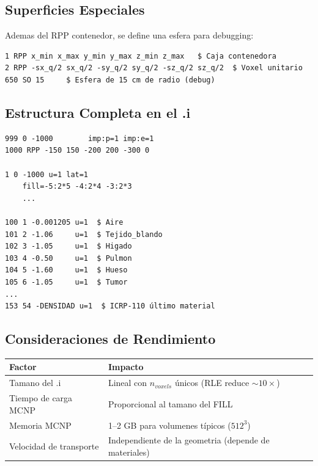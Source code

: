 \documentclass[12pt,a4paper]{article}
\begin{document}

\subsection{Superficies Especiales}

Ademas del RPP contenedor, se define una esfera para debugging:

\begin{lstlisting}
1 RPP x_min x_max y_min y_max z_min z_max   $ Caja contenedora
2 RPP -sx_q/2 sx_q/2 -sy_q/2 sy_q/2 -sz_q/2 sz_q/2  $ Voxel unitario
650 SO 15     $ Esfera de 15 cm de radio (debug)
\end{lstlisting}

\subsection{Estructura Completa en el .i}

\begin{lstlisting}
999 0 -1000        imp:p=1 imp:e=1
1000 RPP -150 150 -200 200 -300 0

1 0 -1000 u=1 lat=1
    fill=-5:2*5 -4:2*4 -3:2*3
    ...

100 1 -0.001205 u=1  $ Aire
101 2 -1.06     u=1  $ Tejido_blando
102 3 -1.05     u=1  $ Higado
103 4 -0.50     u=1  $ Pulmon
104 5 -1.60     u=1  $ Hueso
105 6 -1.05     u=1  $ Tumor
...
153 54 -DENSIDAD u=1  $ ICRP-110 último material
\end{lstlisting}

\subsection{Consideraciones de Rendimiento}

\begin{center}
\begin{tabular}{ll}
\toprule
\textbf{Factor} & \textbf{Impacto} \\
\midrule
Tamano del .i & Lineal con $n_{voxels}$ únicos (RLE reduce $\sim 10\times$) \\
Tiempo de carga MCNP & Proporcional al tamano del FILL \\
Memoria MCNP & 1--2 GB para volumenes típicos ($512^3$) \\
Velocidad de transporte & Independiente de la geometria (depende de materiales) \\
\bottomrule
\end{tabular}
\end{center}
\end{document}
